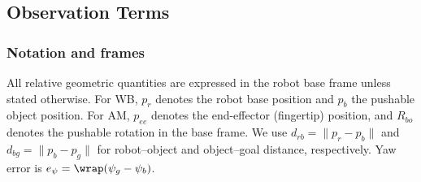 \appendix


\subsection{Observation Terms}
\label{app:obs_terms}

\subsubsection{Notation and frames}
All relative geometric quantities are expressed in the robot base frame unless stated otherwise.
For WB, $p_r$ denotes the robot base position and $p_b$ the pushable object position.
For AM, $p_{ee}$ denotes the end-effector (fingertip) position, and $R_{bo}$ denotes the pushable rotation in the base frame.
We use $d_{rb}=\|p_r-p_b\|$ and $d_{bg}=\|p_b-p_g\|$ for robot--object and object--goal distance, respectively.
Yaw error is $e_\psi=\wrap(\psi_g-\psi_b)$.

